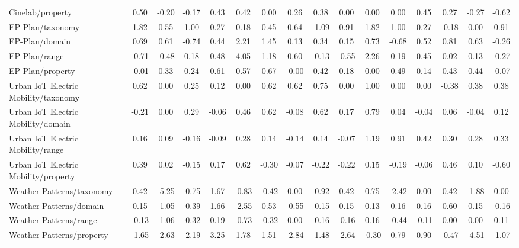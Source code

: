 \begin{tabular}{lccccccccccccccc}
Cinelab/property & 0.50 & -0.20 & -0.17 & 0.43 & 0.42 & 0.00 & 0.26 & 0.38 & 0.00 & 0.00 & 0.00 & 0.45 & 0.27 & -0.27 & -0.62 \\
EP-Plan/taxonomy & 1.82 & 0.55 & 1.00 & 0.27 & 0.18 & 0.45 & 0.64 & -1.09 & 0.91 & 1.82 & 1.00 & 0.27 & -0.18 & 0.00 & 0.91 \\
EP-Plan/domain & 0.69 & 0.61 & -0.74 & 0.44 & 2.21 & 1.45 & 0.13 & 0.34 & 0.15 & 0.73 & -0.68 & 0.52 & 0.81 & 0.63 & -0.26 \\
EP-Plan/range & -0.71 & -0.48 & 0.18 & 0.48 & 4.05 & 1.18 & 0.60 & -0.13 & -0.55 & 2.26 & 0.19 & 0.45 & 0.02 & 0.13 & -0.27 \\
EP-Plan/property & -0.01 & 0.33 & 0.24 & 0.61 & 0.57 & 0.67 & -0.00 & 0.42 & 0.18 & 0.00 & 0.49 & 0.14 & 0.43 & 0.44 & -0.07 \\
Urban IoT Electric Mobility/taxonomy & 0.62 & 0.00 & 0.25 & 0.12 & 0.00 & 0.62 & 0.62 & 0.75 & 0.00 & 1.00 & 0.00 & 0.00 & -0.38 & 0.38 & 0.38 \\
Urban IoT Electric Mobility/domain & -0.21 & 0.00 & 0.29 & -0.06 & 0.46 & 0.62 & -0.08 & 0.62 & 0.17 & 0.79 & 0.04 & -0.04 & 0.06 & -0.04 & 0.12 \\
Urban IoT Electric Mobility/range & 0.16 & 0.09 & -0.16 & -0.09 & 0.28 & 0.14 & -0.14 & 0.14 & -0.07 & 1.19 & 0.91 & 0.42 & 0.30 & 0.28 & 0.33 \\
Urban IoT Electric Mobility/property & 0.39 & 0.02 & -0.15 & 0.17 & 0.62 & -0.30 & -0.07 & -0.22 & -0.22 & 0.15 & -0.19 & -0.06 & 0.46 & 0.10 & -0.60 \\
Weather Patterns/taxonomy & 0.42 & -5.25 & -0.75 & 1.67 & -0.83 & -0.42 & 0.00 & -0.92 & 0.42 & 0.75 & -2.42 & 0.00 & 0.42 & -1.88 & 0.00 \\
Weather Patterns/domain & 0.15 & -1.05 & -0.39 & 1.66 & -2.55 & 0.53 & -0.55 & -0.15 & 0.15 & 0.13 & 0.16 & 0.16 & 0.60 & 0.15 & -0.16 \\
Weather Patterns/range & -0.13 & -1.06 & -0.32 & 0.19 & -0.73 & -0.32 & 0.00 & -0.16 & -0.16 & 0.16 & -0.44 & -0.11 & 0.00 & 0.00 & 0.11 \\
Weather Patterns/property & -1.65 & -2.63 & -2.19 & 3.25 & 1.78 & 1.51 & -2.84 & -1.48 & -2.64 & -0.30 & 0.79 & 0.90 & -0.47 & -4.51 & -1.07 \\
\bottomrule
\end{tabular}
